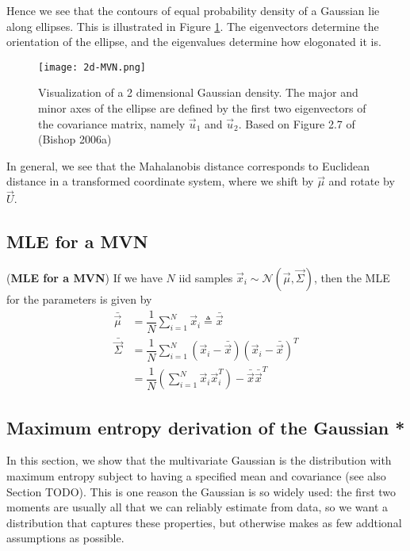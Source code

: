 Hence we see that the contours of equal probability density of a Gaussian lie along ellipses. This is illustrated in Figure \ref{fig:2d-MVN}. The eigenvectors determine the orientation of the ellipse, and the eigenvalues determine how elogonated it is.

\begin{figure}[hbtp]
\centering
    \texttt{[image: 2d-MVN.png]}
\caption{Visualization of a 2 dimensional Gaussian density. The major and minor axes of the ellipse are defined by the first two eigenvectors of the covariance matrix, namely $\vec{u}_1$ and $\vec{u}_2$. Based on Figure 2.7 of (Bishop 2006a)}
\label{fig:2d-MVN} 
\end{figure}

In general, we see that the Mahalanobis distance corresponds to Euclidean distance in a transformed coordinate system, where we shift by $\vec{\mu}$ and rotate by $\vec{U}$.


\subsection{MLE for a MVN}
\begin{theorem}(\textbf{MLE for a MVN})
If we have $N$ iid samples $\vec{x}_i \sim \mathcal{N}(\vec{\mu},\vec{\Sigma})$, then the MLE for the parameters is given by
\begin{align}
\bar{\vec{\mu}}    & =\dfrac{1}{N}\sum\limits_{i=1}^N \vec{x}_i \triangleq \bar{\vec{x}} \\
\bar{\vec{\Sigma}} & =\dfrac{1}{N}\sum\limits_{i=1}^N (\vec{x}_i-\bar{\vec{x}})(\vec{x}_i-\bar{\vec{x}})^T \\
                     & =\dfrac{1}{N}\left(\sum\limits_{i=1}^N \vec{x}_i\vec{x}_i^T\right)-\bar{\vec{x}}\bar{\vec{x}}^T
\end{align}
\end{theorem}


\subsection{Maximum entropy derivation of the Gaussian *}
In this section, we show that the multivariate Gaussian is the distribution with maximum entropy subject to having a specified mean and covariance (see also Section TODO). This is one reason the Gaussian is so widely used: the first two moments are usually all that we can reliably estimate from data, so we want a distribution that captures these properties, but otherwise makes as few addtional assumptions as possible.

